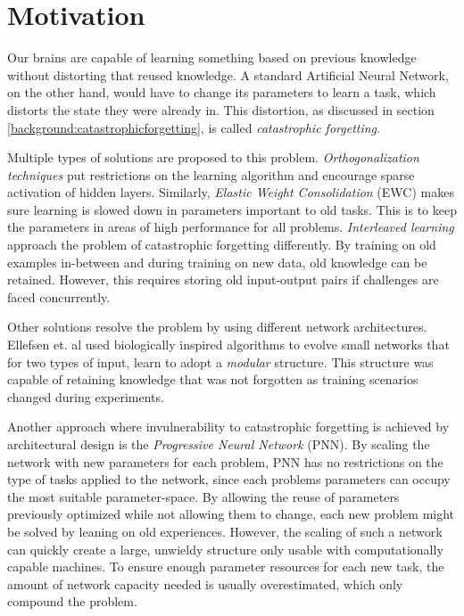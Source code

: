 \section{Motivation}
Our brains are capable of learning something based on previous knowledge without distorting that reused knowledge. A standard Artificial Neural Network, on the other hand, would have to change its parameters to learn a task, which distorts the state they were already in. This distortion, as discussed in section \ref{background:catastrophicforgetting}, is called \textit{catastrophic forgetting}.

Multiple types of solutions are proposed to this problem. \emph{Orthogonalization techniques}\cite{Orthogonal} put restrictions on the learning algorithm and encourage sparse activation of hidden layers. Similarly, \emph{Elastic Weight Consolidation}\cite{ewc} (EWC) makes sure learning is slowed down in parameters important to old tasks. This is to keep the parameters in areas of high performance for all problems. \emph{Interleaved learning}\cite{interleavedlearning} approach the problem of catastrophic forgetting differently. By training on old examples in-between and during training on new data, old knowledge can be retained. However, this requires storing old input-output pairs if challenges are faced concurrently.

Other solutions resolve the problem by using different network architectures. Ellefsen et. al\cite{kai} used biologically inspired algorithms to evolve small networks that for two types of input, learn to adopt a \textit{modular} structure. This structure was capable of retaining knowledge that was not forgotten as training scenarios changed during experiments. 

Another approach where invulnerability to catastrophic forgetting is achieved by architectural design is the \emph{Progressive Neural Network}\cite{progressiveneuralnetworks} (PNN). By scaling the network with new parameters for each problem, PNN has no restrictions on the type of tasks applied to the network, since each problems parameters can occupy the most suitable parameter-space. By allowing the reuse of parameters previously optimized while not allowing them to change, each new problem might be solved by leaning on old experiences. However, the scaling of such a network can quickly create a large, unwieldy structure only usable with computationally capable machines. To ensure enough parameter resources for each new task, the amount of network capacity needed is usually overestimated, which only compound the problem. 

